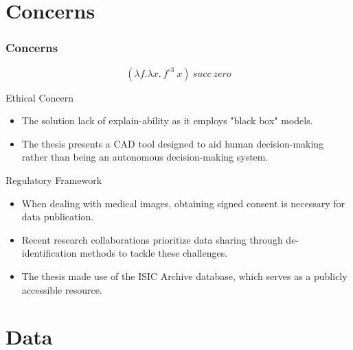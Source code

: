 \documentclass[dvipsnames,mathserif]{beamer}
\begin{document}
{\begin{frame}
    \end{frame}





    \section{Concerns}


    \begin{frame}
      \frametitle{Concerns}

      \[(\lambda f. \lambda x.\ f^{\circ 3}\ x)\ succ\ zero\]
    \end{frame}

    \begin{frame}
      \large Ethical Concern
      \vspace{0.25cm}

      \footnotesize
      \begin{itemize}
        \item The solution lack of explain-ability as it employs "black box" models.
        \item The thesis presents a CAD tool designed to aid human decision-making
          rather than being an autonomous decision-making system.
      \end{itemize}
    \end{frame}

    \begin{frame}

      \large Regulatory Framework
      \vspace{0.25cm}

      \footnotesize

      \begin{itemize}
        \item When dealing with medical images, obtaining signed consent is
          necessary for data publication.
        \item Recent research collaborations prioritize data sharing through
          de-identification methods to tackle these challenges.
        \item The thesis made use of the ISIC Archive database, which serves as
          a publicly accessible resource.
      \end{itemize}


    \end{frame}



    \section{Data}

}
\end{document}
